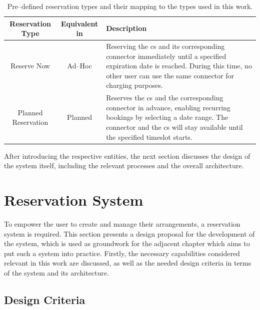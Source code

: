 \begingroup
\setlength{\tabcolsep}{10pt} %
\renewcommand{\arraystretch}{1.5} %
\begin{table}[h]
    \centering
    \caption{Pre--defined reservation types and their mapping to the types used in this work.}
    \begin{tabular}{c|c|m{6.5cm}}
        Reservation Type & Equivalent in \cite{basmadjian_reference_2020,basmadjian_interoperable_2019} & Description \\ \hline
        Reserve Now & Ad--Hoc & Reserving the \acrshort{cs} and its corresponding connector immediately until a specified expiration date is reached. During this time, no other user can use the same connector for charging purposes. \\
        Planned Reservation & Planned & Reserves the \acrshort{cs} and the corresponding connector in advance, enabling recurring bookings by selecting a date range. The connector and the \acrshort{cs} will stay available until the specified timeslot starts.
    \end{tabular}
    \label{tab:reservation-types}
\end{table}
\endgroup

\noindent After introducing the respective entities, the next section discusses the design of the system itself, including the relevant processes and the overall architecture. 

\newpage

\section{Reservation System}
\label{ch:Design:sec:Reservation System}

To empower the user to create and manage their arrangements, a reservation system is required. This section presents a design proposal for the development of the system, which is used as groundwork for the adjacent chapter which aims to put such a system into practice. Firstly, the necessary capabilities considered relevant in this work are discussed, as well as the needed design criteria in terms of the system and its architecture.

\subsection{Design Criteria}
\label{ch:Design:sec:Reservation System:ssec:Design Criteria}

